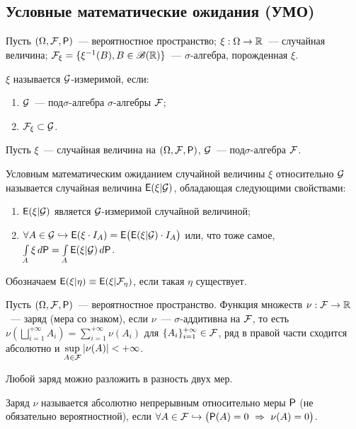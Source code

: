 \subsection{Условные математические ожидания (УМО)}
Пусть $(\Omega, \F, \P)$~--- вероятностное пространство; $\xi: \Omega \rightarrow \R$~--- случайная величина; $\F_\xi = \{ \xi^{-1}(B), B \in \B(\R) \}$~--- $\sigma$-алгебра, порожденная $\xi$. 

\begin{definition}
    $\xi$ называется $\G$-измеримой, если:
    \begin{enumerate}
        \item $\G$~--- под$\sigma$-алгебра $\sigma$-алгебры $\F$;
        \item $\F_\xi \subset \G$.
    \end{enumerate}
\end{definition}

\begin{definition}
	Пусть $\xi$~--- случайная величина на $(\Omega, \F, \P)$, $\G$~--- под$\sigma$-алгебра $\F$. 
	
	Условным математическим ожиданием случайной величины $\xi$ относительно $\G$ называется случайная величина $\E (\xi | \G)$, обладающая следующими свойствами:
	\begin{enumerate}
		\item $\E(\xi | \G )$ является $\G$-измеримой случайной величиной;
		\item $\forall A \in \G \hookrightarrow \E ( \xi \cdot I_A) = \E \big( \E (\xi | \G )\cdot I_A \big)$ или, что тоже самое, $\int\limits_A \xi \, d \P = \int\limits_A \E (\xi | \G )\,d \P$.
	\end{enumerate}
	Обозначаем $\E (\xi | \eta ) \equiv \E (\xi | \F_\eta )$, если такая $\eta$ существует.
\end{definition}
\begin{definition}
	Пусть $(\Omega, \F, \P)$~--- вероятностное пространство. Функция множеств $\nu: \F \rightarrow \R$~--- заряд (мера со знаком), если $\nu$~--- $\sigma$-аддитивна на $\F$, то есть $\nu \left( \bigsqcup\limits_{i=1}^{+\infty} A_i \right) = \sum\limits_{i=1}^{+\infty} \nu (A_i)$ для $\{ A_i \}_{i=1}^{+\infty} \in \F$, ряд в правой части сходится абсолютно и  $\sup\limits_{A \in \F} | \nu(A) | < + \infty$.
	
	Любой заряд можно разложить в разность двух мер.
\end{definition}

\begin{definition}
	Заряд $\nu$ называется абсолютно непрерывным относительно меры $\P$ (не обязательно вероятностной), если $\forall A \in \F \hookrightarrow \big(\P (A) = 0~\Rightarrow~\nu (A) = 0\big)$.
\end{definition}

